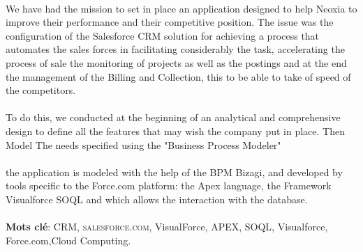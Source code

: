 \documentclass[a4paper, 12pt]{report}
\begin{document}
 \paragraph{}
We have had the mission to set in place an application designed to help Neoxia to improve their performance and their competitive position. The issue was the configuration of the Salesforce CRM solution for achieving a process that automates the sales forces in facilitating considerably the task, accelerating the process of sale the monitoring of projects as well as the postings and at the end the management of the Billing and Collection, this to be able to take of speed of the competitors.
 \paragraph{}
To do this, we conducted at the beginning of an analytical and comprehensive design to define all the features that may wish the company put in place.
Then Model The needs specified using the "Business Process Modeler"
\paragraph{}
the application is modeled with the help of the BPM Bizagi, and developed by tools specific to the Force.com platform: the Apex language, the Framework Visualforce SOQL and which allows the interaction with the database.
\newline
\newline
\newline
 \paragraph{}
\textbf{Mots clé}: CRM, \textsc{salesforce.com}, VisualForce, APEX, SOQL, Visualforce, Force.com,Cloud Computing.



\printnomenclature %

\listoffigures %

\listoftables %

\tableofcontents %



\end{document}
